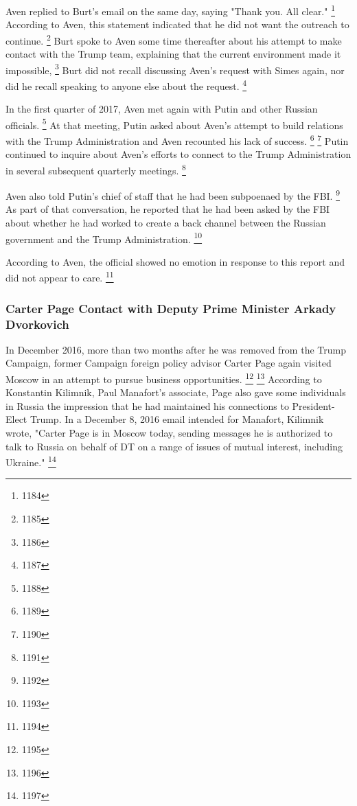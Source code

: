 Aven replied to Burt's email on the same day, saying "Thank you. All clear."%
\footnote{1184}
According to Aven, this statement indicated that he did not want the outreach to continue.%
\footnote{1185}
Burt spoke to Aven some time thereafter about his attempt to make contact with the Trump team, explaining that the current environment made it impossible,
\footnote{1186}
Burt did not recall discussing Aven's request with Simes again, nor did he recall speaking to anyone else about the request.%
\footnote{1187}

In the first quarter of 2017, Aven met again with Putin and other Russian officials.%
\footnote{1188}
At that meeting, Putin asked about Aven's attempt to build relations with the Trump Administration and Aven recounted his lack of success.%
\footnote{1189}
\footnote{1190}
Putin continued to inquire about Aven's efforts to connect to the Trump Administration in several subsequent quarterly meetings.%
\footnote{1191}

Aven also told Putin's chief of staff that he had been subpoenaed by the FBI.%
\footnote{1192}
As part of that conversation, he reported that he had been asked by the FBI about whether he had worked to create a back channel between the Russian government and the Trump Administration.%
\footnote{1193}

According to Aven, the official showed no emotion in response to this report and did not appear to care.%
\footnote{1194}

\subsubsection{Carter Page Contact with Deputy Prime Minister Arkady Dvorkovich}

In December 2016, more than two months after he was removed from the Trump Campaign, former Campaign foreign policy advisor Carter Page again visited Moscow in an attempt to pursue business opportunities.%
\footnote{1195}
\footnote{1196}
According to Konstantin Kilimnik, Paul Manafort's associate, Page also gave some individuals in Russia the impression that he had maintained his connections to President-Elect Trump.
In a December 8, 2016 email intended for Manafort, Kilimnik wrote, "Carter Page is in Moscow today, sending messages he is authorized to talk to Russia on behalf of DT on a range of issues of mutual interest, including Ukraine."%
\footnote{1197}

